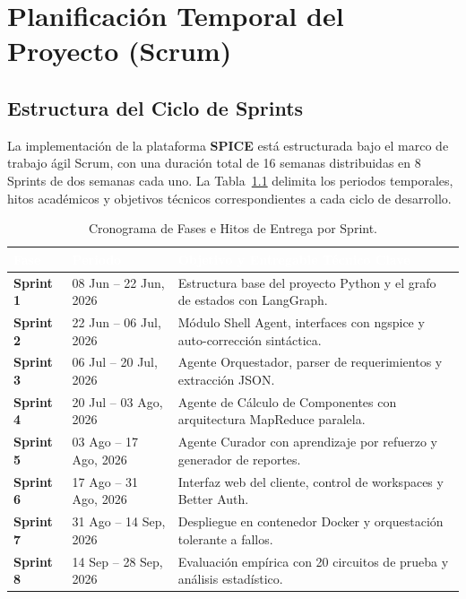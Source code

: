 \documentclass[12pt,letterpaper,oneside]{report}
\begin{document}



\chapter{Planificación Temporal del Proyecto (Scrum)}

\section{Estructura del Ciclo de Sprints}
La implementación de la plataforma \textbf{SPICE} está estructurada bajo el marco de trabajo ágil Scrum, con una duración total de 16 semanas distribuidas en 8 Sprints de dos semanas cada uno. La Tabla~\ref{tab:sprints_definicion} delimita los periodos temporales, hitos académicos y objetivos técnicos correspondientes a cada ciclo de desarrollo.

\begin{table}[h!]
\centering
\small
\caption{Cronograma de Fases e Hitos de Entrega por Sprint.}
\label{tab:sprints_definicion}
\vspace{0.3cm}
\setlength{\aboverulesep}{0pt}
\setlength{\belowrulesep}{0pt}
\renewcommand{\arraystretch}{1.4}
\begin{tabularx}{\textwidth}{l p{3.8cm} >{\raggedright\arraybackslash}X}
\toprule
\rowcolor{guinda}
\textcolor{white}{\textbf{Fase}} & \textcolor{white}{\textbf{Periodo}} & \textcolor{white}{\textbf{Objetivo y Entregable Técnico Clave}} \\
\midrule
\textbf{Sprint 1} & 08 Jun -- 22 Jun, 2026 & Estructura base del proyecto Python y el grafo de estados con LangGraph. \\
\textbf{Sprint 2} & 22 Jun -- 06 Jul, 2026 & Módulo Shell Agent, interfaces con ngspice y auto-corrección sintáctica. \\
\textbf{Sprint 3} & 06 Jul -- 20 Jul, 2026 & Agente Orquestador, parser de requerimientos y extracción JSON. \\
\textbf{Sprint 4} & 20 Jul -- 03 Ago, 2026 & Agente de Cálculo de Componentes con arquitectura MapReduce paralela. \\
\textbf{Sprint 5} & 03 Ago -- 17 Ago, 2026 & Agente Curador con aprendizaje por refuerzo y generador de reportes. \\
\textbf{Sprint 6} & 17 Ago -- 31 Ago, 2026 & Interfaz web del cliente, control de workspaces y Better Auth. \\
\textbf{Sprint 7} & 31 Ago -- 14 Sep, 2026 & Despliegue en contenedor Docker y orquestación tolerante a fallos. \\
\textbf{Sprint 8} & 14 Sep -- 28 Sep, 2026 & Evaluación empírica con 20 circuitos de prueba y análisis estadístico. \\
\bottomrule
\end{tabularx}
\end{table}
\end{document}
